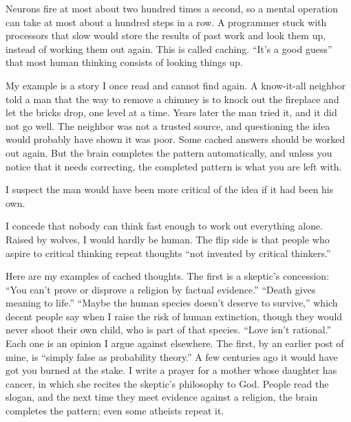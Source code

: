 
Neurons fire at most about two hundred times a second, so a mental operation can take at most about a hundred steps in a row. A programmer stuck with processors that slow would store the results of past work and look them up, instead of working them out again. This is called caching. ``It's a good guess'' that most human thinking consists of looking things up. 

My example is a story I once read and cannot find again. A know-it-all neighbor told a man that the way to remove a chimney is to knock out the fireplace and let the bricks drop, one level at a time. Years later the man tried it, and it did not go well. The neighbor was not a trusted source, and questioning the idea would probably have shown it was poor. Some cached answers should be worked out again. But the brain completes the pattern automatically, and unless you notice that it needs correcting, the completed pattern is what you are left with. 

I suspect the man would have been more critical of the idea if it had been his own. 

I concede that nobody can think fast enough to work out everything alone. Raised by wolves, I would hardly be human. The flip side is that people who aspire to critical thinking repeat thoughts ``not invented by critical thinkers.'' 

Here are my examples of cached thoughts. The first is a skeptic's concession: ``You can't prove or disprove a religion by factual evidence.'' ``Death gives meaning to life.'' ``Maybe the human species doesn't deserve to survive,'' which decent people say when I raise the risk of human extinction, though they would never shoot their own child, who is part of that species. ``Love isn't rational.'' Each one is an opinion I argue against elsewhere.  The first, by an earlier post of mine, is ``simply false as probability theory.'' A few centuries ago it would have got you burned at the stake. I write a prayer for a mother whose daughter has cancer, in which she recites the skeptic's philosophy to God. People read the slogan, and the next time they meet evidence against a religion, the brain completes the pattern; even some atheists repeat it.

